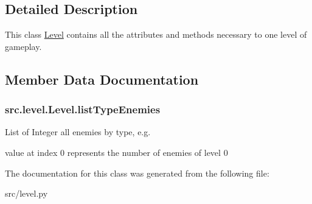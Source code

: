 \subsection{Detailed Description}
This class \hyperlink{classsrc_1_1level_1_1_level}{Level} contains all the attributes and methods necessary to one level of gameplay. 

\subsection{Member Data Documentation}
\hypertarget{classsrc_1_1level_1_1_level_a198d86791a4f4a570909d80490057ae9}{}
\subsubsection[{list\+Type\+Enemies}]{\setlength{\rightskip}{0pt plus 5cm}src.\+level.\+Level.\+list\+Type\+Enemies}\label{classsrc_1_1level_1_1_level_a198d86791a4f4a570909d80490057ae9}


List of Integer all enemies by type, e.\+g. 

value at index 0 represents the number of enemies of level 0 

The documentation for this class was generated from the following file\+:\begin{DoxyCompactItemize}
\item 
src/level.\+py\end{DoxyCompactItemize}

